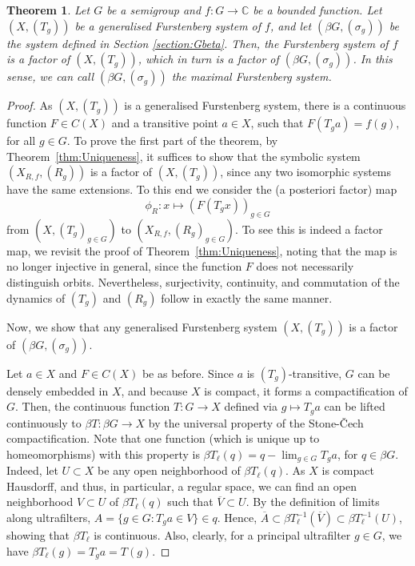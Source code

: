\documentclass{amsart}
\numberwithin{equation}{section}
\newtheorem{theorem}[lemma]{Theorem}
\theoremstyle{definition}
\theoremstyle{plain}
\newcommand{\C}{{\mathbb C}}
\begin{document}
\begin{theorem} \label{maximalFS}
Let $G$ be a semigroup and $f:G\to \C$ be a bounded function. Let $(X,(T_g))$ be a generalised 
Furstenberg system of $f$, and let $(\beta G, (\sigma_g))$ be the system defined in 
Section \ref{section:Gbeta}. Then, the Furstenberg system of $f$ is a factor 
of $(X,(T_g))$, which in turn is a factor of $(\beta G, (\sigma_g))$. In this sense, we can call $(\beta G, (\sigma_g))$ the \emph{maximal Furstenberg system}.
\end{theorem}
\begin{proof}
As $(X,(T_g))$ is a generalised Furstenberg system, there is a continuous function $F\in C(X)$ and a transitive point $a\in X$, such that $F(T_ga)=f(g)$, for all $g\in G$. 
To prove the first part of the theorem, by Theorem~\ref{thm:Uniqueness}, it suffices to show that the symbolic system $(X_{R,f}, (R_g))$ is a factor of $(X, (T_g))$, since any two isomorphic systems have the same extensions. To this end we consider the (a posteriori factor) map 
$$\phi_R: x \mapsto (F(T_gx))_{g\in G}$$
from $(X, (T_g)_{g\in G})$ to $(X_{R,f}, (R_g)_{g\in G})$. To see this is indeed a factor map, we revisit the proof of Theorem~\ref{thm:Uniqueness}, noting that the map is no longer injective in general, since the function $F$ does not necessarily distinguish orbits. Nevertheless, surjectivity, continuity, and commutation of the dynamics of $(T_g)$ and $(R_g)$ follow in exactly the same manner.

Now, we show that any generalised Furstenberg system 
$(X, (T_g))$ is a factor of $(\beta G, (\sigma_g))$. 

Let $a \in X$ and $F \in C(X)$ be as before.  
Since $a$ is $(T_g)$-transitive, $G$ can be densely 
embedded in $X$, and because $X$ is compact, it 
forms a compactification of $G$. Then, the 
continuous function $T:G \to X$ defined via $g \mapsto T_ga$ 
can be lifted continuously to $\beta T: \beta G \to X$ 
by the universal 
property of the Stone-\v{C}ech compactification. Note 
that one function 
(which is unique up to homeomorphisms) with 
this property is 
$\beta T_{\ell}(q)=q-\lim_{g\in G} T_ga$, 
for $q\in \beta G$. Indeed, let $U\subset X$ be any open neighborhood of $\beta T_{\ell}(q)$. As $X$ is compact Hausdorff, and thus, in particular, a regular space, we can find an open neighborhood $V\subset U$ of $\beta T_{\ell}(q)$ such that $\overline{V}\subset U$. By the definition of limits along ultrafilters, $A=\{g\in G: T_ga \in V\}\in q$. Hence, $\overline{A} \subset \beta T_{\ell}^{-1}(\overline{V}) \subset \beta T_{\ell}^{-1}(U)$, showing that $\beta T_{\ell}$ is continuous. Also, clearly, for a principal ultrafilter $g\in G$, we have $\beta T_{\ell}(g)=T_ga=T(g)$.


\end{proof}
\end{document}
